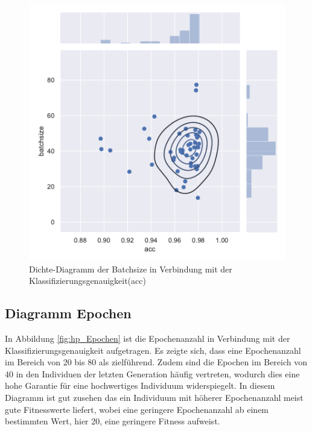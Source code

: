 \begin{figure}[H]
  \centering  
  \includegraphics[scale=0.9]{img/hp_batchsize.pdf}
  \caption{Dichte-Diagramm der Batchsize in Verbindung mit der Klassifizierungsgenauigkeit(acc)}
  \label{fig:hp_Batchsize}
\end{figure}

\newpage

\subsection{Diagramm Epochen}
In Abbildung \ref{fig:hp_Epochen} ist die Epochenanzahl in Verbindung mit der Klassifizierungsgenauigkeit aufgetragen. Es zeigte sich, dass eine Epochenanzahl im Bereich von 20 bis 80 als zielführend. Zudem sind die Epochen im Bereich von 40 in den Individuen der letzten Generation häufig vertreten, wodurch dies eine hohe Garantie für eine hochwertiges Individuum widerspiegelt. In diesem Diagramm ist gut zusehen das ein Individuum mit höherer Epochenanzahl meist gute Fitnesswerte liefert, wobei eine geringere Epochenanzahl ab einem bestimmten Wert, hier 20, eine geringere Fitness aufweist.

